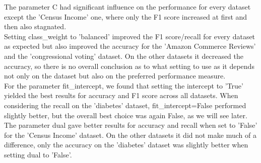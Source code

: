 \documentclass[a4paper,10pt]{article}
\begin{document}
The parameter \textsf{C} had significant influence on the performance for every dataset except the 'Census Income' one, where only the F1 score increased at first and then also stagnated.\\
Setting \textsf{class\_weight} to 'balanced' improved the F1 score/recall for every dataset as expected but also improved the accuracy for the 'Amazon Commerce Reviews' and the 'congressional voting' dataset. On the other datasets it decreased the accuracy, so there is no overall conclusion as to what setting to use as it depends not only on the dataset but also on the preferred performance measure.\\
For the parameter \textsf{fit\_intercept}, we found that setting the intercept to 'True' yielded the best results for accuracy and F1 score across all datasets. When considering the recall on the 'diabetes' dataset, \textsf{fit\_intercept}=False performed slightly better, but the overall best choice was again False, as we will see later.\\
The parameter \textsf{dual} gave better results for accuracy and recall when set to 'False' for the 'Census Income' dataset. On the other datasets it did not make much of a difference, only the accuracy on the 'diabetes' dataset was slightly better when setting \textsf{dual} to 'False'.
\end{document}
